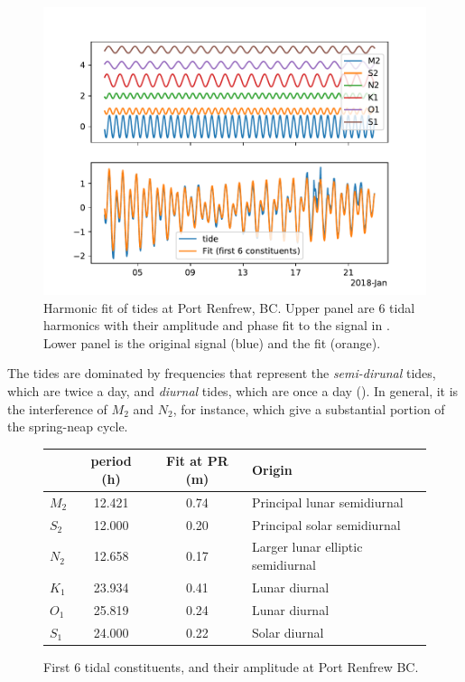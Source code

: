 \begin{figure}[hbt]
  \begin{center}
    \includegraphics{figs/Waves/FitRenfrew}
    \caption{Harmonic fit of tides at  Port Renfrew, BC.  Upper panel are 6 tidal harmonics with their amplitude and phase fit to the signal in .  Lower panel is the original signal (blue) and the fit (orange).}
    \label{fig:FitRenfrew}  
  \end{center}
\end{figure}

The tides are dominated by frequencies that represent the \emph{semi-dirunal} tides, which are twice a day, and \emph{diurnal} tides, which are once a day ().  In general, it is the interference of $M_2$ and $N_2$, for instance, which give a substantial portion of the spring-neap cycle.  

\begin{figure}[hbt]
  \begin{tabular}{l|ccl}
     & period (h) & Fit at PR (m) & Origin \\
    \hline\hline
    $M_2$ & 12.421 & 0.74 & Principal lunar semidiurnal\\
    $S_2$ & 12.000 & 0.20 & Principal solar semidiurnal\\
    $N_2$ & 12.658 & 0.17 & Larger lunar elliptic semidiurnal\\\hline
    $K_1$ & 23.934 & 0.41 & Lunar diurnal\\
    $O_1$ & 25.819 & 0.24 & Lunar diurnal\\
    $S_1$ & 24.000 & 0.22 & Solar diurnal\\
  \end{tabular}
  \caption{First 6 tidal constituents, and their amplitude at Port Renfrew BC.  }
  \label{tab:TideConst}
\end{figure}



